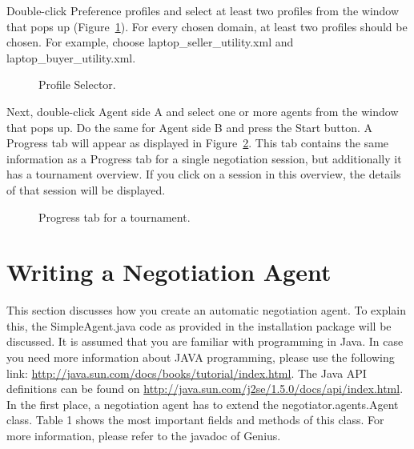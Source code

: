 \documentclass[]{article}
\begin{document}
Double-click Preference profiles and select at least two profiles from the window that pops up (Figure~\ref{Fig:profile}). For every chosen domain, at least two profiles should be chosen. For example, choose laptop\_seller\_utility.xml and laptop\_buyer\_utility.xml.

\begin{figure}
\caption{Profile Selector.}\label{Fig:profile}
\end{figure}

Next, double-click Agent side A and select one or more agents from the window that pops up. Do the same for Agent side B and press the Start button. A Progress tab will appear as displayed in Figure~\ref{Fig:tournament progress}. This tab contains the same information as a Progress tab for a single negotiation session, but additionally it has a tournament overview. If you click on a session in this overview, the details of that session will be displayed.

\begin{figure}
\caption{Progress tab for a tournament.}\label{Fig:tournament progress}
\end{figure}

\section{Writing a Negotiation Agent}

This section discusses how you create an automatic negotiation agent. To explain this, the SimpleAgent.java code as provided in the installation package will be discussed.
It is assumed that you are familiar with programming in Java. In case you need more information about JAVA programming, please use the following link: \url{http://java.sun.com/docs/books/tutorial/index.html}. The Java API definitions can be found on \url{http://java.sun.com/j2se/1.5.0/docs/api/index.html}.
In the first place, a negotiation agent has to extend the negotiator.agents.Agent class. Table 1 shows the most important fields and methods of this class. For more information, please refer to the javadoc of Genius.
\end{document}

